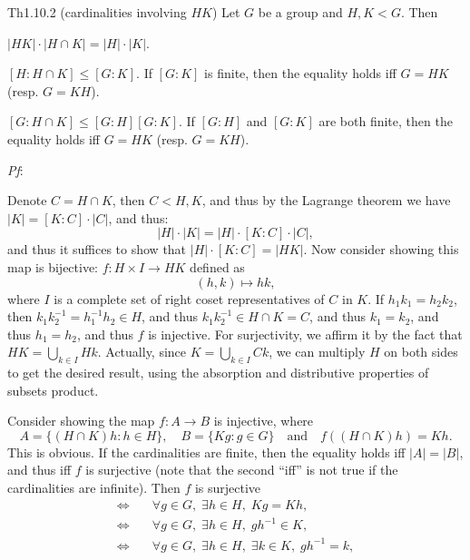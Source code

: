 \documentclass{article}
\begin{document}
\begin{Th}{Th1.10.2 (cardinalities involving $HK$)}
    Let $G$ be a group and $H, K<G$. Then
    \begin{compactenum}
        \item $|HK|\cdot |H\cap K| = |H|\cdot |K|$.
        \item $[H:H\cap K] \leq [G:K]$. If $[G:K]$ is finite, then the equality holds iff $G = HK$ (resp. $G = KH$).
        \item $[G:H\cap K] \leq [G:H][G:K]$. If $[G:H]$ and $[G:K]$ are both finite, then the equality holds iff $G = HK$ (resp. $G = KH$).
    \end{compactenum}
    \tcblower
    \textit{Pf}:
    \begin{compactenum}
        \item Denote $C = H\cap K$, then $C<H, K$, and thus by the Lagrange theorem we have $|K| = [K:C]\cdot |C|$, and thus:
        $$ |H|\cdot |K| = |H|\cdot [K:C]\cdot |C|, $$
        and thus it suffices to show that $|H|\cdot [K:C] = |HK|$. Now consider showing this map is bijective: $f: H\times I \to HK$ defined as
        $$ (h, k)\mapsto hk, $$
        where $I$ is a complete set of right coset representatives of $C$ in $K$. If $h_1k_1 = h_2k_2$, then $k_1k_2^{-1} = h_1^{-1}h_2\in H$, and thus $k_1k_2^{-1} \in H\cap K = C$, and thus $k_1 = k_2$, and thus $h_1 = h_2$, and thus $f$ is injective. For surjectivity, we affirm it by the fact that $HK = \bigcup_{k\in I} Hk$. Actually, since $K = \bigcup_{k\in I} Ck$, we can multiply $H$ on both sides to get the desired result, using the absorption and distributive properties of subsets product.
        \item Consider showing the map $f: A\to B$ is injective, where
        $$ A = \{(H\cap K)h: h\in H\}, \quad B = \{Kg: g\in G\} \quad\text{and}\quad f((H\cap K)h) = Kh. $$
        This is obvious. If the cardinalities are finite, then the equality holds iff $|A| = |B|$, and thus iff $f$ is surjective (note that the second ``iff'' is not true if the cardinalities are infinite). Then $f$ is surjective 
        $$ \begin{aligned}
            \Longleftrightarrow \quad & \forall g\in G,\; \exists h\in H,\; Kg = Kh, \\
            \Longleftrightarrow \quad & \forall g\in G,\; \exists h\in H,\; gh^{-1}\in K, \\
            \Longleftrightarrow \quad & \forall g\in G,\; \exists h\in H,\; \exists k\in K,\; gh^{-1} = k, \\

\end{aligned}$$
\end{compactenum}
\end{Th}
\end{document}
